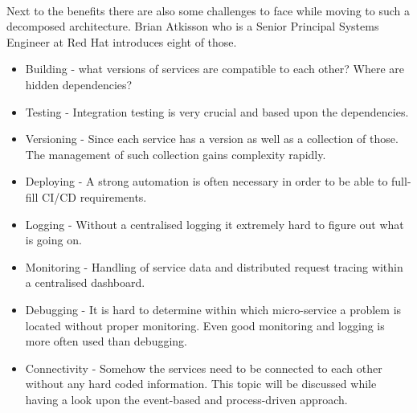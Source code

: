 \\
Next to the benefits there are also some challenges to face while moving to such a decomposed architecture. Brian Atkisson who is a Senior Principal Systems Engineer at Red Hat introduces eight of those. 
\begin{itemize}
    \item Building - what versions of services are compatible to each other? Where are hidden dependencies?
    \item Testing - Integration testing is very crucial and based upon the dependencies. 
    \item Versioning - Since each service has a version as well as a collection of those. The management of such collection gains complexity rapidly.
    \item Deploying - A strong automation is often necessary in order to be able to full-fill CI/CD requirements.
    \item Logging - Without a centralised logging it extremely hard to figure out what is going on.
    \item Monitoring - Handling of service data and distributed request tracing within a centralised dashboard.
    \item Debugging - It is hard to determine within which micro-service a problem is located without proper monitoring. Even good monitoring and logging is more often used than debugging.
    \item Connectivity - Somehow the services need to be connected to each other without any hard coded information. This topic will be discussed while having a look upon the event-based and process-driven approach. 
\end{itemize}
\cite{ChallengesMicroservices}

